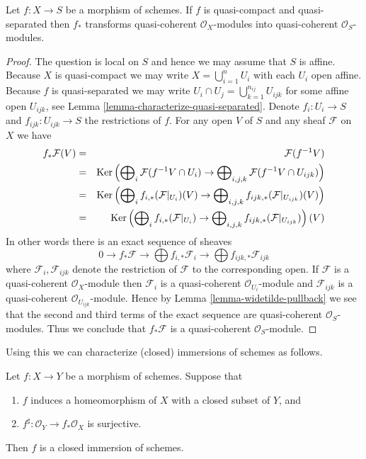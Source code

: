 \begin{lemma}
\label{lemma-push-forward-quasi-coherent}
Let $f : X \to S$ be a morphism of schemes.
If $f$ is quasi-compact and quasi-separated then
$f_*$ transforms quasi-coherent $\mathcal{O}_X$-modules
into quasi-coherent $\mathcal{O}_S$-modules.
\end{lemma}

\begin{proof}
The question is local on $S$ and hence we may assume that
$S$ is affine. Because $X$ is quasi-compact we may write
$X = \bigcup_{i = 1}^n U_i$ with each $U_i$ open affine.
Because $f$ is quasi-separated we may write
$U_i \cap U_j = \bigcup_{k = 1}^{n_{ij}} U_{ijk}$ for some
affine open $U_{ijk}$, see Lemma \ref{lemma-characterize-quasi-separated}.
Denote $f_i : U_i \to S$ and $f_{ijk} : U_{ijk} \to S$ the
restrictions of $f$. For any open $V$ of $S$ and any sheaf
$\mathcal{F}$ on $X$ we have
\begin{eqnarray*}
f_*\mathcal{F}(V) & = & \mathcal{F}(f^{-1}V) \\
& = &
\mathop{\mathrm{Ker}}\left(
\bigoplus\nolimits_i \mathcal{F}(f^{-1}V \cap U_i)
\to
\bigoplus\nolimits_{i, j, k} \mathcal{F}(f^{-1}V \cap U_{ijk})\right) \\
& = &
\mathop{\mathrm{Ker}}\left(
\bigoplus\nolimits_i f_{i, *}(\mathcal{F}|_{U_i})(V)
\to
\bigoplus\nolimits_{i, j, k} f_{ijk, *}(\mathcal{F}|_{U_{ijk}})(V)\right) \\
& = &
\mathop{\mathrm{Ker}}\left(
\bigoplus\nolimits_i f_{i, *}(\mathcal{F}|_{U_i})
\to
\bigoplus\nolimits_{i, j, k} f_{ijk, *}(\mathcal{F}|_{U_{ijk}})\right)(V)
\end{eqnarray*}
In other words there is an exact sequence of sheaves
$$
0 \to f_*\mathcal{F}
\to \bigoplus f_{i, *}\mathcal{F}_i
\to \bigoplus f_{ijk, *}\mathcal{F}_{ijk}
$$
where $\mathcal{F}_i, \mathcal{F}_{ijk}$ denote the
restriction of $\mathcal{F}$ to the corresponding open.
If $\mathcal{F}$ is a quasi-coherent $\mathcal{O}_X$-module
then $\mathcal{F}_i$ is a quasi-coherent $\mathcal{O}_{U_i}$-module
and $\mathcal{F}_{ijk}$ is a quasi-coherent $\mathcal{O}_{U_{ijk}}$-module.
Hence by Lemma \ref{lemma-widetilde-pullback} we see that the second and
third terms of the exact sequence are quasi-coherent
$\mathcal{O}_S$-modules. Thus we conclude that
$f_*\mathcal{F}$ is a quasi-coherent $\mathcal{O}_S$-module.
\end{proof}

\noindent
Using this we can characterize (closed) immersions of schemes
as follows.

\begin{lemma}
\label{lemma-characterize-closed-immersions}
Let $f : X \to Y$ be a morphism of schemes.
Suppose that
\begin{enumerate}
\item $f$ induces a homeomorphism of $X$ with a
closed subset of $Y$, and
\item $f^\sharp : \mathcal{O}_Y \to f_*\mathcal{O}_X$
is surjective.
\end{enumerate}
Then $f$ is a closed immersion of schemes.
\end{lemma}

